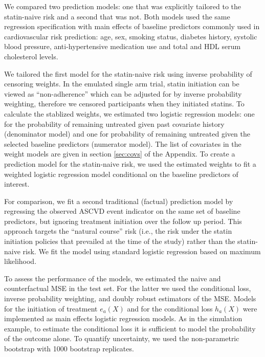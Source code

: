 We compared two prediction models: one that was explicitly tailored to the statin-naive risk and a second that was not. Both models used the same regression specification with main effects of baseline predictors commonly used in cardiovascular risk prediction: age, sex, smoking status, diabetes history, systolic blood pressure, anti-hypertensive medication use and total and HDL serum cholesterol levels.

We tailored the first model for the statin-naive risk using inverse probability of censoring weights. In the emulated single arm trial, statin initiation can be viewed as ``non-adherence'' which can be adjusted for by inverse probability weighting, therefore we censored participants when they initiated statins. To calculate the stablized weights, we estimated two logistic regression models: one for the probability of remaining untreated given past covariate history (denominator model) and one for probability of remaining untreated given the selected baseline predictors (numerator model). The list of covariates in the weight models are given in section \ref{sec:covs} of the Appendix. To create a prediction model for the statin-naive risk, we used the estimated weights to fit a weighted logistic regression model conditional on the baseline predictors of interest. 

For comparison, we fit a second traditional (factual) prediction model by regressing the observed ASCVD event indicator on the same set of baseline predictors, but ignoring treatment initiation over the follow up period. This approach targets the ``natural course'' risk (i.e., the risk under the statin initiation policies that prevailed at the time of the study) rather than the statin-naive risk. We fit the model using standard logistic regression based on maximum likelihood.

To assess the performance of the models, we estimated the naive and counterfactual MSE in the test set. For the latter we used the conditional loss, inverse probability weighting, and doubly robust estimators of the MSE. Models for the initiation of treatment $e_a(X)$ and for the conditional loss $h_a(X)$ were implemented as main effects logistic regression models. As in the simulation example, to estimate the conditional loss it is sufficient to model the probability of the outcome alone. To quantify uncertainty, we used the non-parametric bootstrap with 1000 bootstrap replicates.


